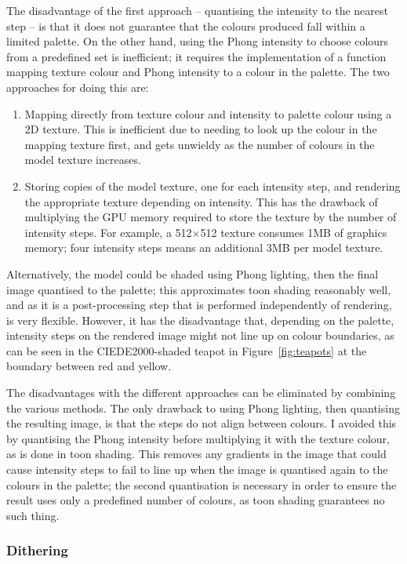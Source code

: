 \documentclass[12pt,twoside,notitlepage]{report}
\begin{document}
The disadvantage of the first approach -- quantising the intensity to the nearest step -- is that it does not guarantee that the colours produced fall within a limited palette. On the other hand, using the Phong intensity to choose colours from a predefined set is inefficient; it requires the implementation of a function mapping texture colour and Phong intensity to a colour in the palette. The two approaches for doing this are:
\begin{enumerate}
\item Mapping directly from texture colour and intensity to palette colour using a 2D texture. This is inefficient due to needing to look up the colour in the mapping texture first, and gets unwieldy as the number of colours in the model texture increases.
\item Storing copies of the model texture, one for each intensity step, and rendering the appropriate texture depending on intensity. This has the drawback of multiplying the GPU memory required to store the texture by the number of intensity steps. For example, a 512$\times$512 texture consumes 1MB of graphics memory; four intensity steps means an additional 3MB per model texture.
\end{enumerate}

Alternatively, the model could be shaded using Phong lighting, then the final image quantised to the palette; this approximates toon shading reasonably well, and as it is a post-processing step that is performed independently of rendering, is very flexible. However, it has the disadvantage that, depending on the palette, intensity steps on the rendered image might not line up on colour boundaries, as can be seen in the CIEDE2000-shaded teapot in Figure~\ref{fig:teapots} at the boundary between red and yellow.

The disadvantages with the different approaches can be eliminated by combining the various methods. The only drawback to using Phong lighting, then quantising the resulting image, is that the steps do not align between colours. I avoided this by quantising the Phong intensity before multiplying it with the texture colour, as is done in toon shading. This removes any gradients in the image that could cause intensity steps to fail to line up when the image is quantised again to the colours in the palette; the second quantisation is necessary in order to ensure the result uses only a predefined number of colours, as toon shading guarantees no such thing.

\subsubsection{Dithering}
\end{document}
